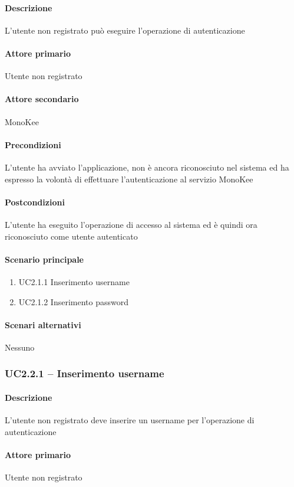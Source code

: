 \paragraph{Descrizione}  L’utente non registrato può eseguire l’operazione di autenticazione 
\paragraph{Attore primario}  Utente non registrato
\paragraph{Attore secondario}  MonoKee
\paragraph{Precondizioni}  L’utente ha avviato l’applicazione, non è ancora riconosciuto nel sistema ed ha espresso la volontà di effettuare l’autenticazione al servizio MonoKee
\paragraph{Postcondizioni}  L’utente ha eseguito l’operazione di accesso al sistema ed è quindi ora riconosciuto come utente autenticato
\paragraph{Scenario principale}  
    \begin{enumerate}
        \item UC2.1.1 Inserimento username
        \item UC2.1.2 Inserimento password
    \end{enumerate}
\paragraph{Scenari alternativi}  Nessuno


\subsubsection{UC2.2.1 – Inserimento username}
\paragraph{Descrizione}  L’utente non registrato deve inserire un username per l’operazione di autenticazione
\paragraph{Attore primario}  Utente non registrato

